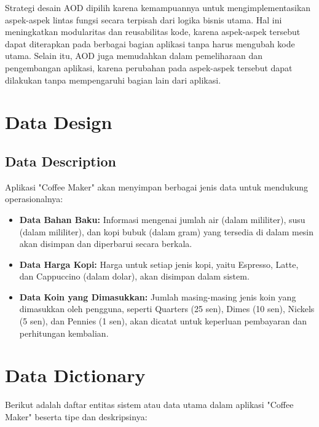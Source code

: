 \documentclass[12pt]{article}
\begin{document}
Strategi desain AOD dipilih karena kemampuannya untuk mengimplementasikan aspek-aspek lintas fungsi secara terpisah dari logika bisnis utama. Hal ini meningkatkan modularitas dan reusabilitas kode, karena aspek-aspek tersebut dapat diterapkan pada berbagai bagian aplikasi tanpa harus mengubah kode utama. Selain itu, AOD juga memudahkan dalam pemeliharaan dan pengembangan aplikasi, karena perubahan pada aspek-aspek tersebut dapat dilakukan tanpa mempengaruhi bagian lain dari aplikasi.


\section{Data Design}
\subsection{Data Description}
Aplikasi "Coffee Maker" akan menyimpan berbagai jenis data untuk mendukung operasionalnya:

\begin{itemize}
\item \textbf{Data Bahan Baku:} Informasi mengenai jumlah air (dalam mililiter), susu (dalam mililiter), dan kopi bubuk (dalam gram) yang tersedia di dalam mesin akan disimpan dan diperbarui secara berkala.
\item \textbf{Data Harga Kopi:} Harga untuk setiap jenis kopi, yaitu Espresso, Latte, dan Cappuccino (dalam dolar), akan disimpan dalam sistem.
\item \textbf{Data Koin yang Dimasukkan:} Jumlah masing-masing jenis koin yang dimasukkan oleh pengguna, seperti Quarters (25 sen), Dimes (10 sen), Nickels (5 sen), dan Pennies (1 sen), akan dicatat untuk keperluan pembayaran dan perhitungan kembalian.
\end{itemize}

\section{Data Dictionary}
Berikut adalah daftar entitas sistem atau data utama dalam aplikasi "Coffee Maker" beserta tipe dan deskripsinya:
\end{document}

